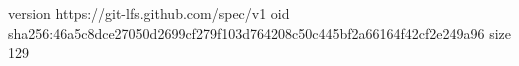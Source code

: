 version https://git-lfs.github.com/spec/v1
oid sha256:46a5c8dce27050d2699cf279f103d764208c50c445bf2a66164f42cf2e249a96
size 129
